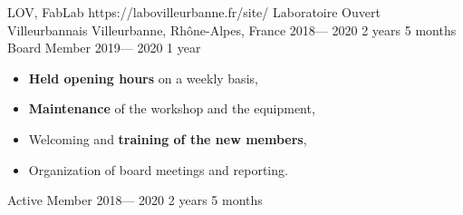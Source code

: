 \volunteerorganization%
{LOV, FabLab}%
{https://labovilleurbanne.fr/site/}%
{Laboratoire Ouvert Villeurbannais}%
{Villeurbanne, Rhône-Alpes, France}%
{2018--- 2020}%
{2 years 5 months}%
\volunteerposition%
{Board Member}%
{2019--- 2020}%
{1 year}%
{
	\begin{itemize}
		\item \textbf{Held opening hours} on a weekly basis,
		\item \textbf{Maintenance} of the workshop and the equipment,
		\item Welcoming and \textbf{training of the new members},
		\item Organization of board meetings and reporting.
	\end{itemize}
}%
\volunteerposition%
{Active Member}%
{2018--- 2020}%
{2 years 5 months}%
{}%

